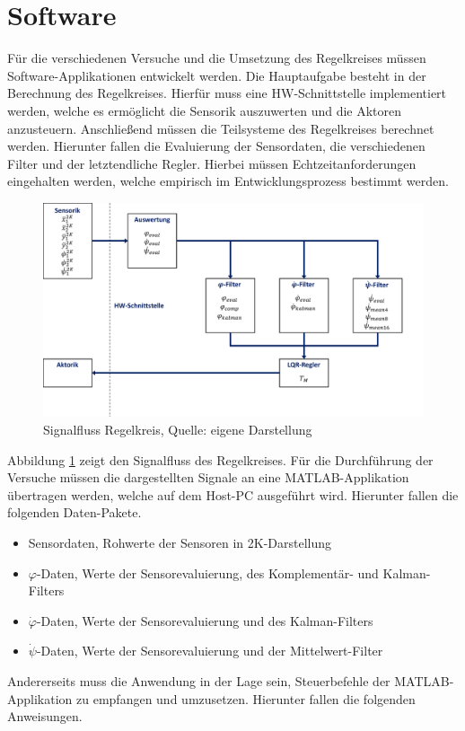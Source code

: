 \documentclass{article}
\begin{document}
\section{Software}
Für die verschiedenen Versuche und die Umsetzung des Regelkreises müssen Software-Applikationen entwickelt werden. Die Hauptaufgabe besteht in der Berechnung des Regelkreises. Hierfür muss eine HW-Schnittstelle implementiert werden, welche es ermöglicht die Sensorik auszuwerten und die Aktoren anzusteuern. Anschließend müssen die Teilsysteme des Regelkreises berechnet werden. Hierunter fallen die Evaluierung der Sensordaten, die verschiedenen Filter und der letztendliche Regler. Hierbei müssen Echtzeitanforderungen eingehalten werden, welche empirisch im Entwicklungsprozess bestimmt werden.
\begin{figure}[h!]
\centering
\includegraphics[width=0.6\linewidth]{img/SW_signalfluss_regelkreis}
\caption{Signalfluss Regelkreis, Quelle: eigene Darstellung}
\label{img_signalfluss_regelkreis}
\end{figure}
Abbildung \ref{img_signalfluss_regelkreis} zeigt den Signalfluss des Regelkreises. Für die Durchführung der Versuche müssen die dargestellten Signale an eine MATLAB-Applikation übertragen werden, welche auf dem Host-PC ausgeführt wird. Hierunter fallen die folgenden Daten-Pakete.
\begin{itemize}
\setlength\itemsep{0em}
\item Sensordaten, Rohwerte der Sensoren in 2K-Darstellung
\item $\varphi$-Daten, Werte der Sensorevaluierung, des Komplementär- und Kalman-Filters
\item $\dot{\varphi}$-Daten, Werte der Sensorevaluierung und des Kalman-Filters
\item $\dot{\psi}$-Daten, Werte der Sensorevaluierung und der Mittelwert-Filter
\end{itemize}
Andererseits muss die Anwendung in der Lage sein, Steuerbefehle der MATLAB-Applikation zu empfangen und umzusetzen. Hierunter fallen die folgenden Anweisungen.
\end{document}
